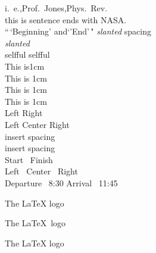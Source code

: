 \documentclass[12pt,twoside,a4paper]{article}   %
\begin{document}
	i.~e.,Prof.~Jones,Phys.\ Rev.\\ %
	this is sentence ends with NASA\@.\\ %
	\frenchspacing %
	\nonfrenchspacing  %
	``\,`Beginning' and`'End'\,"
	{\slshape slanted\/} spacing\\ %
 	\textsl{slanted}\\
 	self\/ful			selfful\\
 	This is\hspace{1cm}1cm\\	
 	This is \hspace{1cm}1cm\\
 	This is \hspace{1cm} 1cm\\
 	\hspace*{3em} This is 1cm\\ %
	\vspace{1cm}
 	Left \hfill Right\\ %
 	Left \hfill Center \hfill Right\\
	\quad insert spacing\\
	\qquad insert spacing\\
 	Start \dotfill\ Finish\\ %
 	Left \hrulefill\ Center \hrulefill\ Right\\ %
 	Departure \dotfill\dotfill\dotfill\ 8:30 \hfill\hfill Arrival \hrulefill\ 11:45\\
	\vfill	%

	The \LaTeX{} logo

	The \LaTeX\ logo

	The {\LaTeX} logo
\end{document}
